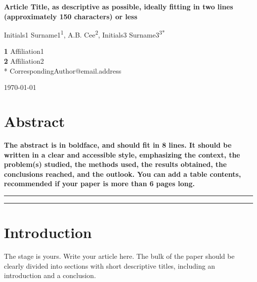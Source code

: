 \documentclass{SciPost}
\begin{document}
\begin{center}{\Large \textbf{
Article Title, as descriptive as possible, ideally fitting in two lines (approximately 150 characters) or less
}}\end{center}

\begin{center}
Initials1 Surname1\textsuperscript{1}, 
A.B. Cee\textsuperscript{2}, 
Initials3 Surname3\textsuperscript{3*}
\end{center}

\begin{center}
{\bf 1} Affiliation1
\\
{\bf 2} Affiliation2
\\
* CorrespondingAuthor@email.address
\end{center}

\begin{center}
\today
\end{center}


\section*{Abstract}
{\bf 
The abstract is in boldface, and should fit in 8 lines.
It should be written in a clear and accessible style, emphasizing the context, the problem(s) studied, the methods used, the results obtained, the conclusions reached, and the outlook. You can add a table contents, recommended if your paper is more than 6 pages long. 
}


\vspace{10pt}
\noindent\rule{\textwidth}{1pt}
\tableofcontents\thispagestyle{fancy}
\noindent\rule{\textwidth}{1pt}
\vspace{10pt}


\section{Introduction}
\label{sec:intro}
The stage is yours. Write your article here.
The bulk of the paper should be clearly divided into sections with short descriptive titles, including an introduction and a conclusion.
\end{document}
